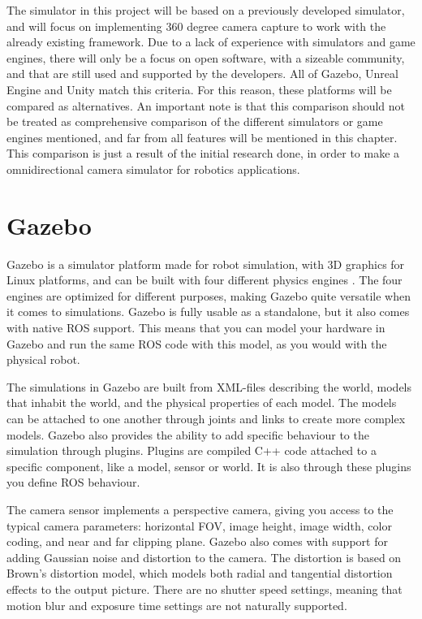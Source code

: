 The simulator in this project will be based on a previously developed simulator, and will focus on implementing 360 degree camera capture to work with the already existing framework. Due to a lack of experience with simulators and game engines, there will only be a focus on open software, with a sizeable community, and that are still used and supported by the developers. All of Gazebo, Unreal Engine and Unity match this criteria. For this reason, these platforms will be compared as alternatives. An important note is that this comparison should not be treated as comprehensive comparison of the different simulators or game engines mentioned, and far from all features will be mentioned in this chapter. This comparison is just a result of the initial research done, in order to make a omnidirectional camera simulator for robotics applications.

\section{Gazebo} \label{sec:Gazebo}

Gazebo is a simulator platform made for robot simulation, with 3D graphics for Linux platforms, and can be built with four different physics engines \cite{Gazebo_phys}. The four engines are optimized for different purposes, making Gazebo quite versatile when it comes to simulations. Gazebo is fully usable as a standalone, but it also comes with native ROS support. This means that you can model your hardware in Gazebo and run the same ROS code with this model, as you would with the physical robot.

The simulations in Gazebo are built from XML-files describing the world, models that inhabit the world, and the physical properties of each model. The models can be attached to one another through joints and links to create more complex models. Gazebo also provides the ability to add specific behaviour to the simulation through plugins. Plugins are compiled C++ code attached to a specific component, like a model, sensor or world. It is also through these plugins you define ROS behaviour.

The camera sensor implements a perspective camera, giving you access to the typical camera parameters: horizontal FOV, image height, image width, color coding, and near and far clipping plane. Gazebo also comes with support for adding Gaussian noise and distortion to the camera. The distortion is based on Brown's distortion model, which models both radial and tangential distortion effects to the output picture. There are no shutter speed settings, meaning that motion blur and exposure time settings are not naturally supported.

